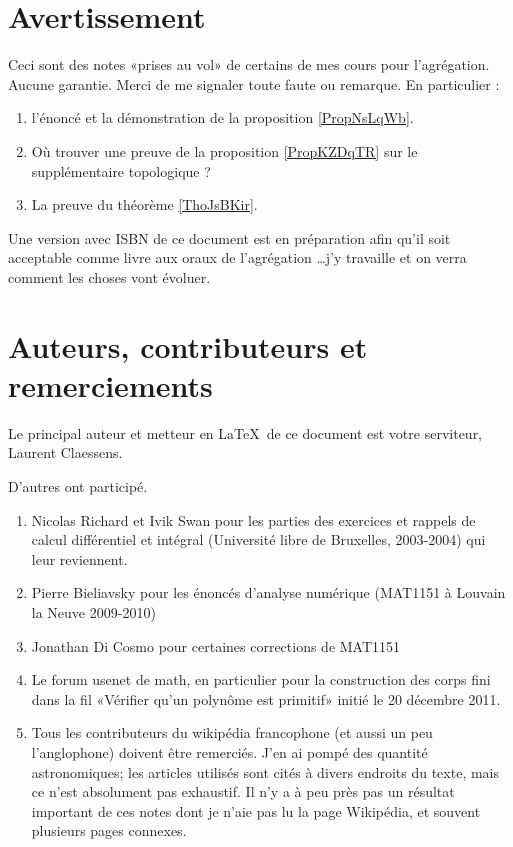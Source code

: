\section{Avertissement}

Ceci sont des notes «prises au vol» de certains de mes cours pour l'agrégation. Aucune garantie. Merci de me signaler toute faute ou remarque. En particulier :
\begin{enumerate}
    \item
        l'énoncé et la démonstration de la proposition \ref{PropNsLqWb}.
    \item
        Où trouver une preuve de la proposition \ref{PropKZDqTR} sur le supplémentaire topologique ?
    \item
        La preuve du théorème \ref{ThoJsBKir}.
\end{enumerate}

Une version avec ISBN de ce document est en préparation afin qu'il soit acceptable comme livre aux oraux de l'agrégation \ldots j'y travaille et on verra comment les choses vont évoluer.

\section{Auteurs, contributeurs et remerciements}

Le principal auteur et metteur en \LaTeX\ de ce document est votre serviteur, Laurent Claessens.

D'autres ont participé.
\begin{enumerate}
    \item
        Nicolas Richard et Ivik Swan pour les parties des exercices et rappels de calcul différentiel et intégral (Université libre de Bruxelles, 2003-2004) qui leur reviennent.
    \item
        Pierre Bieliavsky pour les énoncés d'analyse numérique (MAT1151 à Louvain la Neuve 2009-2010)
    \item
        Jonathan Di Cosmo pour certaines corrections de MAT1151
    \item
        Le forum usenet de math, en particulier pour la construction des corps fini dans la fil «Vérifier qu'un polynôme est primitif» initié le 20 décembre 2011.
    \item
        Tous les contributeurs du wikipédia francophone (et aussi un peu l'anglophone) doivent être remerciés. J'en ai pompé des quantité astronomiques; les articles utilisés sont cités à divers endroits du texte, mais ce n'est absolument pas exhaustif. Il n'y a à peu près pas un résultat important de ces notes dont je n'aie pas lu la page Wikipédia, et souvent plusieurs pages connexes.
\end{enumerate}

